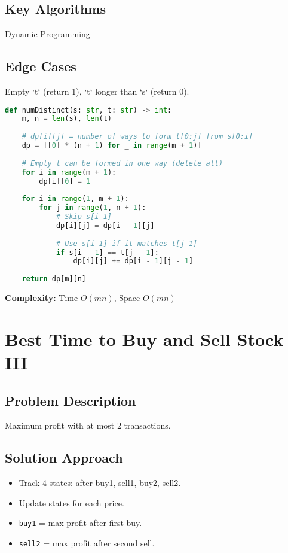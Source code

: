 \documentclass[10pt, a4paper]{article}
\begin{document}
\subsection*{Key Algorithms}
Dynamic Programming

\subsection*{Edge Cases}
Empty `t` (return 1), `t` longer than `s` (return 0).

\begin{lstlisting}[language=Python]
def numDistinct(s: str, t: str) -> int:
    m, n = len(s), len(t)
    
    # dp[i][j] = number of ways to form t[0:j] from s[0:i]
    dp = [[0] * (n + 1) for _ in range(m + 1)]
    
    # Empty t can be formed in one way (delete all)
    for i in range(m + 1):
        dp[i][0] = 1
    
    for i in range(1, m + 1):
        for j in range(1, n + 1):
            # Skip s[i-1]
            dp[i][j] = dp[i - 1][j]
            
            # Use s[i-1] if it matches t[j-1]
            if s[i - 1] == t[j - 1]:
                dp[i][j] += dp[i - 1][j - 1]
    
    return dp[m][n]
\end{lstlisting}
\textbf{Complexity:} Time $O(mn)$, Space $O(mn)$

\section{Best Time to Buy and Sell Stock III}
\subsection*{Problem Description}
Maximum profit with at most 2 transactions.

\subsection*{Solution Approach}
\begin{itemize}
    \item Track 4 states: after buy1, sell1, buy2, sell2.
    \item Update states for each price.
    \item \texttt{buy1} = max profit after first buy.
    \item \texttt{sell2} = max profit after second sell.
\end{itemize}
\end{document}
